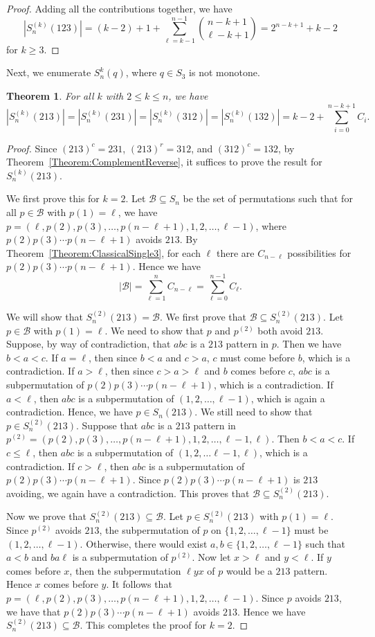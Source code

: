 \documentclass[11pt]{article}
\newtheorem{theorem}{Theorem}[section]
\theoremstyle{definition}
\numberwithin{equation}{section}
\begin{document}
\begin{proof}
Adding all the contributions together, we have
\[
|S_n^{(k)}(123)|=(k-2)+1+\sum_{\ell=k-1}^{n-1}\binom{n-k+1}{\ell-k+1}=2^{n-k+1}+k-2
\]
for $k\geq3$.
\end{proof}
Next, we enumerate $S_n^{k}(q)$, where $q\in S_3$ is not monotone.
\begin{theorem}\label{Theorem:NonMonotonePatterns}
    For all $k$ with $2\leq k\leq n$, we have
    \[
|S_n^{(k)}(213)|=|S_n^{(k)}(231)|=|S_n^{(k)}(312)|=|S_n^{(k)}(132)|=k-2+\sum_{i=0}^{n-k+1}C_i.
    \]
\end{theorem}
\begin{proof}
Since $(213)^c=231$, $(213)^r=312$, and $(312)^c=132$, by Theorem~\ref{Theorem:ComplementReverse}, it suffices to prove the result for $S_n^{(k)}(213)$.

We first prove this for $k=2$. Let $\mathcal{B}\subseteq S_n$ be the set of permutations such 
that for all $p\in\mathcal{B}$ with $p(1)=\ell$, 
we have $p=(\ell,p(2),p(3),\ldots,p(n-\ell+1),1,2,\ldots,\ell-1)$, where $p(2)p(3)\cdots p(n-\ell+1)$ 
avoids $213$.  By Theorem~\ref{Theorem:ClassicalSingle3}, for each $\ell$ there are $C_{n-\ell}$ 
possibilities for $p(2)p(3)\cdots p(n-\ell+1)$. Hence we have
\[
|\mathcal{B}|=\sum_{\ell=1}^nC_{n-\ell}=\sum_{\ell=0}^{n-1}C_\ell.
\]

We will show that $S_n^{(2)}(213)=\mathcal{B}$. We first prove that $\mathcal{B}\subseteq S_n^{(2)}(213)$. Let $p\in\mathcal{B}$ with $p(1)=\ell$. We need to show that $p$ and $p^{(2)}$ both avoid $213$. 
Suppose, by way of contradiction, that $abc$ is a $213$ pattern in $p$. Then we have $b<a<c$. If $a=\ell$, 
then since $b<a$ and $c>a$, $c$ must come before $b$, which is a contradiction. 
If $a>\ell$, then since $c>a>\ell$ and $b$ comes before $c$, $abc$ is a subpermutation of $p(2)p(3)\cdots p(n-\ell+1)$, which is a contradiction. If $a<\ell$, then $abc$ is a subpermutation of $(1,2,\ldots,\ell-1)$, which is again a contradiction. Hence, we have $p\in S_n(213)$. We still need to show that $p\in S_n^{(2)}(213)$. 
Suppose that $abc$ is a $213$ pattern in $p^{(2)}=(p(2),p(3),\ldots,p(n-\ell+1),1,2,\ldots,\ell-1,\ell)$. Then $b<a<c$. If $c\leq\ell$, then $abc$ is a 
subpermutation of $(1,2,\ldots\ell-1,\ell)$, which is a contradiction. If $c>\ell$, then $abc$ is a 
subpermutation of $p(2)p(3)\cdots p(n-\ell+1)$. Since $p(2)p(3)\cdots p(n-\ell+1)$ is $213$ avoiding, we again have a contradiction. This proves that $\mathcal{B}\subseteq S_n^{(2)}(213)$.

Now we prove that $S_n^{(2)}(213)\subseteq\mathcal{B}$. Let $p\in S_n^{(2)}(213)$ with $p(1)=\ell$. Since $p^{(2)}$ avoids $213$, the subpermutation of $p$ on $\{1,2,\ldots,\ell-1\}$ must be $(1,2,\ldots,\ell-1)$. Otherwise, there would exist $a,b\in\{1,2,\ldots,\ell-1\}$ such that $a<b$ and $ba\ell$ is a subpermutation of $p^{(2)}$. Now let $x>\ell$ and $y<\ell$. If $y$ comes before $x$, then the subpermutation $\ell yx$ of $p$ would be a $213$ pattern. Hence $x$ comes before $y$. It follows that $p=(\ell,p(2),p(3),\ldots,p(n-\ell+1),1,2,\ldots,\ell-1)$. Since $p$ avoids $213$, we 
have that $p(2)p(3)\cdots p(n-\ell+1)$ avoids $213$. Hence we have $S_n^{(2)}(213)\subseteq\mathcal{B}$. This completes the proof for $k=2$.


\end{proof}
\end{document}
